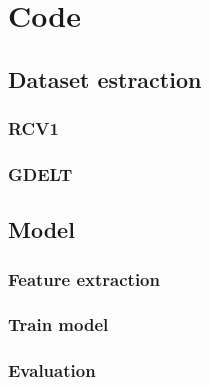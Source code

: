 \appendix
\chapter{Code}

\section{Dataset estraction}

\subsection{RCV1}



\subsection{GDELT}


\section{Model}

\subsection{Feature extraction}


\subsection{Train model}


\subsection{Evaluation}



\listoffigures
\listoftables